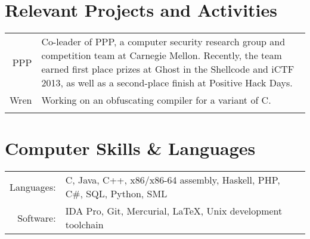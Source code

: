 \documentclass[10pt]{article}
\begin{document}
\section{Relevant Projects and Activities}
\begin{tabular}{r|p{11cm}}
PPP & \footnotesize{Co-leader of PPP, a computer security research group 
and competition team at Carnegie Mellon. Recently, the team earned first
place prizes at Ghost in the Shellcode and iCTF 2013, as well as a
second-place finish at Positive Hack Days.} \\
Wren & \footnotesize{Working on an obfuscating compiler for a variant
of C.} \\
\multicolumn{2}{c}{}\\
\end{tabular}

\section{Computer Skills \& Languages}
\begin{tabular}{rl}
Languages: & C, Java, C++, x86/x86-64 assembly, Haskell, PHP, C\#, SQL,
Python, SML \\
Software: & IDA Pro, Git, Mercurial, \LaTeX, Unix development toolchain \\
\end{tabular}
\end{document}
